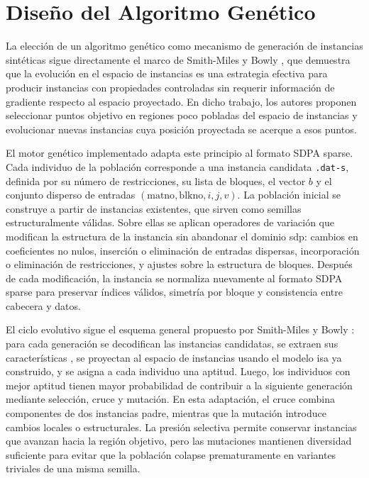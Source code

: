 \section{Diseño del Algoritmo Genético}
\label{sec:disenio_ga}

La elección de un algoritmo genético como mecanismo de generación de instancias sintéticas sigue directamente el marco de Smith-Miles y
Bowly \cite{smith-milesGeneratingNewTest2015}, que demuestra que la evolución en el espacio de instancias es una estrategia efectiva para
producir instancias con propiedades controladas sin requerir información de gradiente respecto al espacio proyectado. En dicho trabajo, los
autores proponen seleccionar puntos objetivo en regiones poco pobladas del espacio de instancias y evolucionar nuevas instancias cuya posición
proyectada se acerque a esos puntos.

El motor genético implementado adapta este principio al formato SDPA sparse. Cada individuo de la población corresponde a una instancia candidata
\texttt{.dat-s}, definida por su número de restricciones, su lista de bloques, el vector $b$ y el conjunto disperso de entradas
$(\text{matno},\text{blkno},i,j,v)$. La población inicial se construye a partir de instancias existentes, que sirven como semillas estructuralmente
válidas. Sobre ellas se aplican operadores de variación que modifican la estructura de la instancia sin abandonar el dominio \acrshort{sdp}: cambios
en coeficientes no nulos, inserción o eliminación de entradas dispersas, incorporación o eliminación de restricciones, y ajustes sobre la estructura
de bloques. Después de cada modificación, la instancia se normaliza nuevamente al formato SDPA sparse para preservar índices válidos, simetría por
bloque y consistencia entre cabecera y datos.

El ciclo evolutivo sigue el esquema general propuesto por Smith-Miles y Bowly \cite{smith-milesGeneratingNewTest2015}: para cada generación se
decodifican las instancias candidatas, se extraen sus características , se proyectan al espacio de instancias usando el modelo
\acrshort{isa} ya construido, y se asigna a cada individuo una aptitud. Luego, los individuos con mejor aptitud tienen mayor probabilidad de
contribuir a la siguiente generación mediante selección, cruce y mutación. En esta adaptación, el cruce combina componentes de dos instancias
padre, mientras que la mutación introduce cambios locales o estructurales. La presión selectiva permite conservar instancias que avanzan hacia la
región objetivo, pero las mutaciones mantienen diversidad suficiente para evitar que la población colapse prematuramente en variantes triviales de
una misma semilla.

